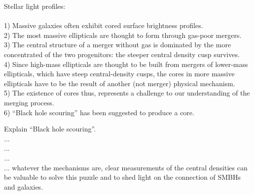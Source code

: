 \documentclass[chicago]{emulateapj}
\begin{document}
\begin{framed}
Stellar light profiles:
\\ \\
1) Massive galaxies often exhibit cored surface brightness profiles.  \\%
2) The most massive ellipticals are thought to form through gas-poor mergers.\\

3) The central structure of a merger without gas is dominated by the more concentrated of the two progenitors: the steeper central density cusp survives. \\

4) Since high-mass ellipticals are thought to be built from mergers of lower-mass ellipticals, which have steep central-density cusps, the cores in more massive ellipticals have to be the result of another (not merger) physical mechanism.  \\

5) The existence of cores thus, represents a challenge to our understanding of the merging process.\\


6) ``Black hole scouring''  has been suggested to produce a core.
\end{framed}

\begin{framed}
Explain ``Black hole scouring''.  \\
...\\
...\\
...\\
... whatever the mechanisms are, clear measurements of the central densities can be valuable to solve this puzzle and to shed light on the connection of SMBHs and galaxies. 
\end{framed}
\end{document}
